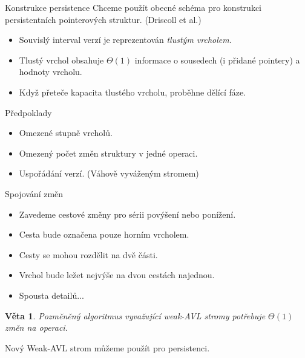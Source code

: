 \documentclass{beamer}
\theoremstyle{mytheoremstyle}
\newtheorem{thm}{Věta}
\begin{document}
\begin{frame}{Konstrukce persistence}
Chceme použít obecné schéma pro konstrukci persistentních pointerových struktur. (Driscoll et al.)

\begin{itemize}
\item
Souvislý interval verzí je reprezentován \emph{tlustým vrcholem}. 
\item 
Tlustý vrchol obsahuje $\Theta(1)$ informace o sousedech (i přidané pointery) a hodnoty vrcholu.
\item
Když přeteče kapacita tlustého vrcholu, proběhne dělící fáze.
\end{itemize}

\pause

\begin{block}{Předpoklady}
\begin{itemize}
  \item {\color{green!80!black}Omezené stupně vrcholů.}
  \item {\color{red}Omezený počet změn struktury v jedné operaci.}
  \item Uspořádání verzí. (Váhově vyváženým stromem)
\end{itemize}
\end{block}

\end{frame}

\begin{frame}{Spojování změn}
\begin{itemize}
\item Zavedeme cestové změny pro sérii povýšení nebo ponížení.
\item Cesta bude označena pouze horním vrcholem.
\item Cesty se mohou rozdělit na dvě části.
\item Vrchol bude ležet nejvýše na dvou cestách najednou.
\item Spousta detailů...
\end{itemize}

\pause

\begin{thm}
Pozměněný algoritmus vyvažující weak-AVL stromy potřebuje $\Theta(1)$ změn na operaci.
\end{thm}

Nový Weak-AVL strom můžeme použít pro persistenci.
\end{frame}
\end{document}
